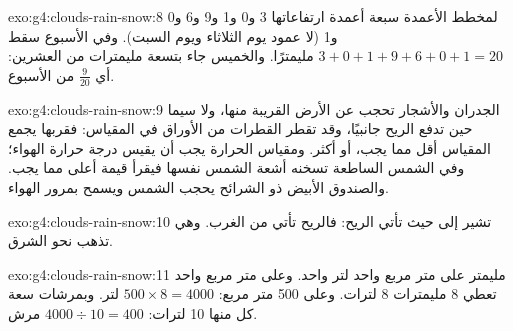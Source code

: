 \begin{solution}{exo:g4:clouds-rain-snow:8}
لمخطط الأعمدة سبعة أعمدة ارتفاعاتها 3 و0 و1 و9 و6 و0 و1 (لا عمود يوم
الثلاثاء ويوم السبت). وفي الأسبوع سقط $3 + 0 + 1 + 9 + 6 + 0 + 1 = 20$
مليمترًا. والخميس جاء بتسعة مليمترات من العشرين: أي $\frac{9}{20}$
من  الأسبوع.
\end{solution}

\begin{solution}{exo:g4:clouds-rain-snow:9}
الجدران والأشجار تحجب  عن الأرض القريبة منها، ولا سيما حين تدفع الريح
 جانبيًا، وقد تقطر القطرات من الأوراق في المقياس: فقربها يجمع
المقياس أقل مما يجب، أو أكثر. ومقياس الحرارة يجب أن يقيس درجة حرارة
الهواء؛ وفي الشمس الساطعة تسخنه أشعة الشمس نفسها فيقرأ قيمة أعلى مما يجب.
والصندوق الأبيض ذو الشرائح يحجب الشمس ويسمح بمرور
الهواء.
\end{solution}

\begin{solution}{exo:g4:clouds-rain-snow:10}
 تشير إلى حيث تأتي الريح: فالريح تأتي من
الغرب. وهي تذهب نحو الشرق.
\end{solution}

\begin{solution}{exo:g4:clouds-rain-snow:11}
مليمتر  على متر مربع واحد لتر واحد. وعلى متر مربع واحد تعطي 8
مليمترات 8 لترات. وعلى 500 متر مربع:
$500 \times 8 = 4000$ لتر. وبمرشات سعة كل منها 10 لترات:
$4000 \div 10 = 400$ مرش.
\end{solution}
